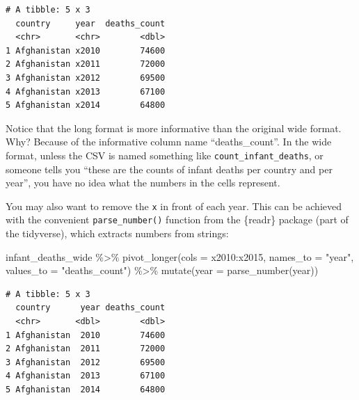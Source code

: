 \documentclass[
  letterpaper,
  DIV=11,
  numbers=noendperiod]{scrreprt}
\newenvironment{Shaded}{\begin{snugshade}}{\end{snugshade}}
\newcommand{\AttributeTok}[1]{\textcolor[rgb]{0.40,0.45,0.13}{#1}}
\newcommand{\FunctionTok}[1]{\textcolor[rgb]{0.28,0.35,0.67}{#1}}
\newcommand{\NormalTok}[1]{\textcolor[rgb]{0.00,0.23,0.31}{#1}}
\newcommand{\SpecialCharTok}[1]{\textcolor[rgb]{0.37,0.37,0.37}{#1}}
\newcommand{\StringTok}[1]{\textcolor[rgb]{0.13,0.47,0.30}{#1}}
\begin{document}
\begin{verbatim}
# A tibble: 5 x 3
  country     year  deaths_count
  <chr>       <chr>        <dbl>
1 Afghanistan x2010        74600
2 Afghanistan x2011        72000
3 Afghanistan x2012        69500
4 Afghanistan x2013        67100
5 Afghanistan x2014        64800
\end{verbatim}

\begin{tcolorbox}[enhanced jigsaw, colframe=quarto-callout-note-color-frame, rightrule=.15mm, opacityback=0, breakable, coltitle=black, colbacktitle=quarto-callout-note-color!10!white, bottomrule=.15mm, leftrule=.75mm, toprule=.15mm, arc=.35mm, bottomtitle=1mm, colback=white, left=2mm, opacitybacktitle=0.6, titlerule=0mm, title=\textcolor{quarto-callout-note-color}{\faInfo}\hspace{0.5em}{Side Note}, toptitle=1mm]

Notice that the long format is more informative than the original wide
format. Why? Because of the informative column name ``deaths\_count''.
In the wide format, unless the CSV is named something like
\texttt{count\_infant\_deaths}, or someone tells you ``these are the
counts of infant deaths per country and per year'', you have no idea
what the numbers in the cells represent.

\end{tcolorbox}

You may also want to remove the \texttt{x} in front of each year. This
can be achieved with the convenient \texttt{parse\_number()} function
from the \{readr\} package (part of the tidyverse), which extracts
numbers from strings:

\begin{Shaded}
\begin{Highlighting}[]
\NormalTok{infant\_deaths\_wide }\SpecialCharTok{\%\textgreater{}\%} 
  \FunctionTok{pivot\_longer}\NormalTok{(}\AttributeTok{cols =}\NormalTok{ x2010}\SpecialCharTok{:}\NormalTok{x2015,}
               \AttributeTok{names\_to =} \StringTok{"year"}\NormalTok{, }
               \AttributeTok{values\_to =} \StringTok{"deaths\_count"}\NormalTok{) }\SpecialCharTok{\%\textgreater{}\%} 
  \FunctionTok{mutate}\NormalTok{(}\AttributeTok{year =} \FunctionTok{parse\_number}\NormalTok{(year))}
\end{Highlighting}
\end{Shaded}

\begin{verbatim}
# A tibble: 5 x 3
  country      year deaths_count
  <chr>       <dbl>        <dbl>
1 Afghanistan  2010        74600
2 Afghanistan  2011        72000
3 Afghanistan  2012        69500
4 Afghanistan  2013        67100
5 Afghanistan  2014        64800
\end{verbatim}
\end{document}
